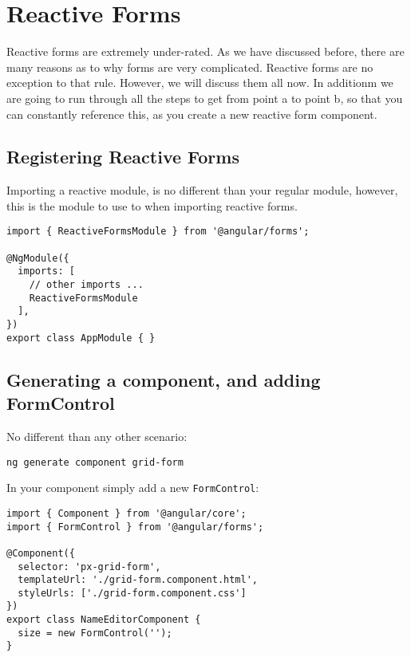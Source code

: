 \maketitle{}
\section{ Reactive Forms }

Reactive forms are extremely under-rated. As we have discussed before, there are 
many reasons as to why forms are very complicated. Reactive forms are no 
exception to that rule. However, we will discuss them all now. In additionm we
are going to run through all the steps to get from point a to point b, so that
you can constantly reference this, as you create a new reactive form component.

\subsection{ Registering Reactive Forms }

Importing a reactive module, is no different than your regular module, however,
this is the module to use to when importing reactive forms. 

\begin{lstlisting}
import { ReactiveFormsModule } from '@angular/forms';

@NgModule({
  imports: [
    // other imports ...
    ReactiveFormsModule
  ],
})
export class AppModule { }
\end{lstlisting}

\subsection{Generating a component, and adding FormControl}
No different than any other scenario: 
\begin{verbatim}
ng generate component grid-form 
\end{verbatim}

In your component simply add a new \lstinline{FormControl}: 

\begin{lstlisting}
import { Component } from '@angular/core';
import { FormControl } from '@angular/forms';

@Component({
  selector: 'px-grid-form',
  templateUrl: './grid-form.component.html',
  styleUrls: ['./grid-form.component.css']
})
export class NameEditorComponent {
  size = new FormControl('');
}
\end{lstlisting}

